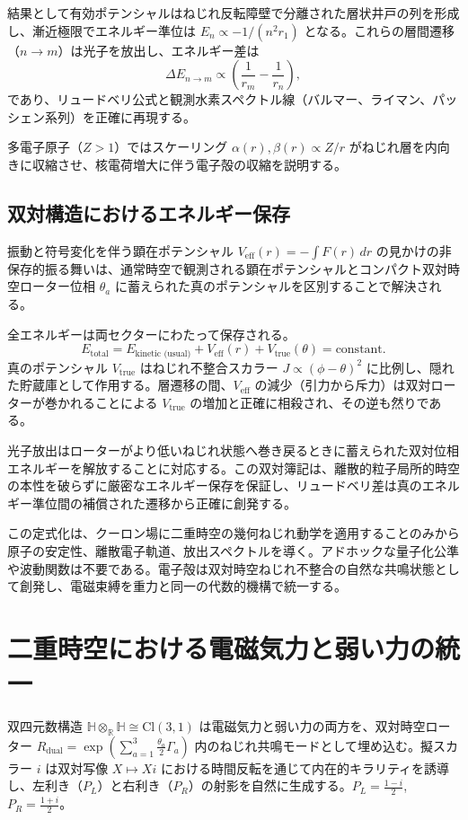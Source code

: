 \documentclass[dvipdfmx,a4paper]{article}
\begin{document}
結果として有効ポテンシャルはねじれ反転障壁で分離された層状井戸の列を形成し、漸近極限でエネルギー準位は $E_n \propto -1/(n^2 r_1)$ となる。これらの層間遷移（$n \to m$）は光子を放出し、エネルギー差は
\[
\Delta E_{n \to m} \propto \left( \frac{1}{r_m} - \frac{1}{r_n} \right),
\]
であり、リュードベリ公式と観測水素スペクトル線（バルマー、ライマン、パッシェン系列）を正確に再現する。

多電子原子（$Z > 1$）ではスケーリング $\alpha(r),\beta(r) \propto Z/r$ がねじれ層を内向きに収縮させ、核電荷増大に伴う電子殻の収縮を説明する。

\subsection{双対構造におけるエネルギー保存}

振動と符号変化を伴う顕在ポテンシャル $V_\text{eff}(r) = -\int F(r)\, dr$ の見かけの非保存的振る舞いは、通常時空で観測される顕在ポテンシャルとコンパクト双対時空ローター位相 $\theta_a$ に蓄えられた真のポテンシャルを区別することで解決される。

全エネルギーは両セクターにわたって保存される。
\[
E_\text{total} = E_\text{kinetic (usual)} + V_\text{eff}(r) + V_\text{true}(\theta) = \text{constant}.
\]
真のポテンシャル $V_\text{true}$ はねじれ不整合スカラー $J \propto (\phi - \theta)^2$ に比例し、隠れた貯蔵庫として作用する。層遷移の間、$V_\text{eff}$ の減少（引力から斥力）は双対ローターが巻かれることによる $V_\text{true}$ の増加と正確に相殺され、その逆も然りである。

光子放出はローターがより低いねじれ状態へ巻き戻るときに蓄えられた双対位相エネルギーを解放することに対応する。この双対簿記は、離散的粒子局所的時空の本性を破らずに厳密なエネルギー保存を保証し、リュードベリ差は真のエネルギー準位間の補償された遷移から正確に創発する。

この定式化は、クーロン場に二重時空の幾何ねじれ動学を適用することのみから原子の安定性、離散電子軌道、放出スペクトルを導く。アドホックな量子化公準や波動関数は不要である。電子殻は双対時空ねじれ不整合の自然な共鳴状態として創発し、電磁束縛を重力と同一の代数的機構で統一する。

\section{二重時空における電磁気力と弱い力の統一}
\label{sec:unification}

双四元数構造 $\mathbb{H} \otimes_{\mathbb{R}} \mathbb{H} \cong \mathrm{Cl}(3,1)$ は電磁気力と弱い力の両方を、双対時空ローター $R_{\text{dual}} = \exp\left( \sum_{a=1}^3 \frac{\theta_a}{2} \Gamma_a \right)$ 内のねじれ共鳴モードとして埋め込む。擬スカラー $i$ は双対写像 $X \mapsto X i$ における時間反転を通じて内在的キラリティを誘導し、左利き（$P_L$）と右利き（$P_R$）の射影を自然に生成する。$P_L = \frac{1 - i}{2}$, $P_R = \frac{1 + i}{2}$。
\end{document}
